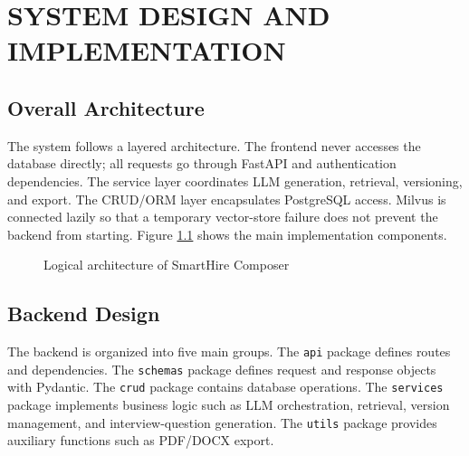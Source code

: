 \documentclass[12pt,a4paper,oneside]{report}
\newcommand{\ProjectName}{SmartHire Composer}
\newcommand{\code}[1]{\texttt{#1}}
\begin{document}
\chapter{SYSTEM DESIGN AND IMPLEMENTATION}

\section{Overall Architecture}
The system follows a layered architecture. The frontend never accesses the database directly; all requests go through FastAPI and authentication dependencies. The service layer coordinates LLM generation, retrieval, versioning, and export. The CRUD/ORM layer encapsulates PostgreSQL access. Milvus is connected lazily so that a temporary vector-store failure does not prevent the backend from starting. Figure \ref{fig:architecture} shows the main implementation components.

\begin{figure}[H]
\centering
{}
\caption{Logical architecture of \ProjectName}
\label{fig:architecture}
\end{figure}

\section{Backend Design}
The backend is organized into five main groups. The \code{api} package defines routes and dependencies. The \code{schemas} package defines request and response objects with Pydantic. The \code{crud} package contains database operations. The \code{services} package implements business logic such as LLM orchestration, retrieval, version management, and interview-question generation. The \code{utils} package provides auxiliary functions such as PDF/DOCX export.
\end{document}
